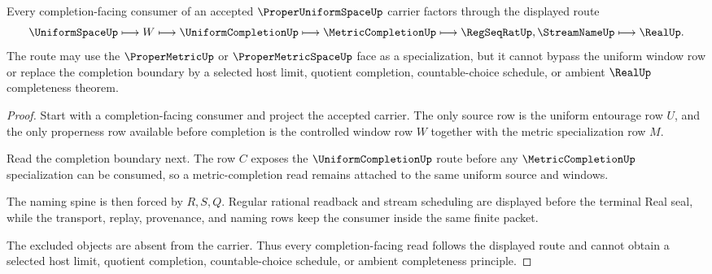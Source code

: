 \begin{theorem}
\label{thm:proper-uniform-space-completion-route}
Every completion-facing consumer of an accepted $\ProperUniformSpaceUp$ carrier factors through the displayed route
$$
\UniformSpaceUp \longmapsto W \longmapsto \UniformCompletionUp \longmapsto \MetricCompletionUp \longmapsto \RegSeqRatUp,\StreamNameUp \longmapsto \RealUp .
$$
The route may use the $\ProperMetricUp$ or $\ProperMetricSpaceUp$ face as a specialization, but it cannot bypass the uniform window row or replace the completion boundary by a selected host limit, quotient completion, countable-choice schedule, or ambient $\RealUp$ completeness theorem.
\end{theorem}
\begin{proof}
Start with a completion-facing consumer and project the accepted carrier. The only source row is the uniform entourage row $U$, and the only properness row available before completion is the controlled window row $W$ together with the metric specialization row $M$.

Read the completion boundary next. The row $C$ exposes the $\UniformCompletionUp$ route before any $\MetricCompletionUp$ specialization can be consumed, so a metric-completion read remains attached to the same uniform source and windows.

The naming spine is then forced by $R,S,Q$. Regular rational readback and stream scheduling are displayed before the terminal Real seal, while the transport, replay, provenance, and naming rows keep the consumer inside the same finite packet.

The excluded objects are absent from the carrier. Thus every completion-facing read follows the displayed route and cannot obtain a selected host limit, quotient completion, countable-choice schedule, or ambient completeness principle.
\end{proof}

